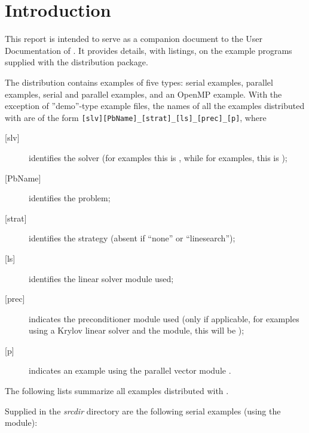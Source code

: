 \section{Introduction}\label{s:ex_intro}

This report is intended to serve as a companion document to the User
Documentation of {\kinsol} \cite{kinsol_ug}.  It provides details, with
listings, on the example programs supplied with the {\kinsol} distribution
package.

The {\kinsol} distribution contains examples of five types: serial
{\CC} examples, parallel {\CC} examples, serial and parallel {\F}
examples, and an OpenMP example.
With the exception of ''demo''-type example files, the names of all the examples 
distributed with {\sundials} are of the form
\verb![slv][PbName]_[strat]_[ls]_[prec]_[p]!, where
\begin{description}
\item [{[slv]}] identifies the solver (for {\kinsol} examples this is , 
  while for {\fkinsol} examples, this is );
\item [{[PbName]}] identifies the problem;
\item [{[strat]}] identifies the strategy (absent if ``none'' or ``linesearch'');
\item [{[ls]}] identifies the linear solver module used;
\item [{[prec]}] indicates the {\kinsol} preconditioner module used
  (only if applicable, for examples using a Krylov linear solver
  and the {\kinbbdpre} module, this will be );
\item [{[p]}] indicates an example using the parallel vector module {\nvecp}.
\end{description}

\vspace{0.2in}\noindent
The following lists summarize all examples distributed with {\kinsol}.

\vspace{0.2in}\noindent
Supplied in the {\em srcdir} directory are the
following serial examples (using the {\nvecs} module):

